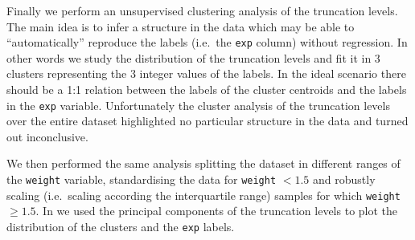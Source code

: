 Finally we perform an unsupervised clustering analysis of the truncation levels.
The main idea is to infer a structure in the data which may be able to ``automatically'' reproduce the labels (i.e.\ the \texttt{exp} column) without regression.
In other words we study the distribution of the truncation levels and fit it in 3 clusters representing the 3 integer values of the labels.\footnotemark{}
In the ideal scenario there should be a 1:1 relation between the labels of the cluster centroids and the labels in the \texttt{exp} variable.
Unfortunately the cluster analysis of the truncation levels over the entire dataset highlighted no particular structure in the data and turned out inconclusive.

We then performed the same analysis splitting the dataset in different ranges of the \texttt{weight} variable, standardising the data for \texttt{weight} $< 1.5$ and robustly scaling (i.e.\ scaling according the interquartile range) samples for which \texttt{weight} $\ge 1.5$.
In  we used the principal components of the truncation levels to plot the distribution of the clusters and the \texttt{exp} labels.

